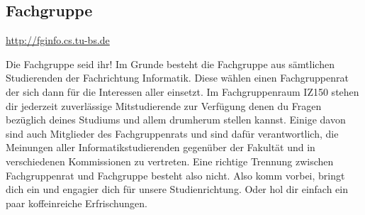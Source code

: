 \subsection{Fachgruppe}
\label{fachgruppe}
\url{http://fginfo.cs.tu-bs.de}

Die Fachgruppe seid ihr! Im Grunde besteht die Fachgruppe aus sämtlichen Studierenden der Fachrichtung Informatik. Diese wählen einen Fachgruppenrat der sich dann für die Interessen aller einsetzt. 
Im Fachgruppenraum IZ150 stehen dir jederzeit zuverlässige Mitstudierende zur Verfügung denen du Fragen bezüglich deines Studiums und allem drumherum stellen kannst. Einige davon sind auch Mitglieder des Fachgruppenrats und sind dafür verantwortlich, die Meinungen aller Informatikstudierenden gegenüber der Fakultät und in verschiedenen Kommissionen zu vertreten. Eine richtige Trennung zwischen Fachgruppenrat und Fachgruppe besteht also nicht. Also komm vorbei, bringt dich ein und engagier dich für unsere Studienrichtung. Oder hol dir einfach ein paar koffeinreiche Erfrischungen. 
